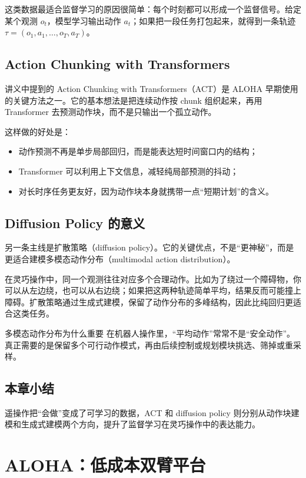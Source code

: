 \documentclass[a4paper]{article}
\begin{document}
这类数据最适合监督学习的原因很简单：每个时刻都可以形成一个监督信号。给定某个观测 \(o_t\)，模型学习输出动作 \(a_t\)；如果把一段任务打包起来，就得到一条轨迹 \(\tau = (o_1,a_1,\ldots,o_T,a_T)\)。

\subsection{Action Chunking with Transformers}

讲义中提到的 Action Chunking with Transformers（ACT）是 ALOHA 早期使用的关键方法之一。它的基本想法是把连续动作按 chunk 组织起来，再用 Transformer 去预测动作块，而不是只输出一个孤立动作。

这样做的好处是：
\begin{itemize}
  \item 动作预测不再是单步局部回归，而是能表达短时间窗口内的结构；
  \item Transformer 可以利用上下文信息，减轻纯局部预测的抖动；
  \item 对长时序任务更友好，因为动作块本身就携带一点“短期计划”的含义。
\end{itemize}

\subsection{Diffusion Policy 的意义}

另一条主线是扩散策略（diffusion policy）。它的关键优点，不是“更神秘”，而是更适合建模多模态动作分布（multimodal action distribution）。

在灵巧操作中，同一个观测往往对应多个合理动作。比如为了绕过一个障碍物，你可以从左边绕，也可以从右边绕；如果把这两种轨迹简单平均，结果反而可能撞上障碍。扩散策略通过生成式建模，保留了动作分布的多峰结构，因此比纯回归更适合这类任务。

\begin{knowledgebox}{多模态动作分布为什么重要}
在机器人操作里，“平均动作”常常不是“安全动作”。真正需要的是保留多个可行动作模式，再由后续控制或规划模块挑选、筛掉或重采样。
\end{knowledgebox}

\subsection{本章小结}

遥操作把“会做”变成了可学习的数据，ACT 和 diffusion policy 则分别从动作块建模和生成式建模两个方向，提升了监督学习在灵巧操作中的表达能力。

\section{ALOHA：低成本双臂平台}
\end{document}
